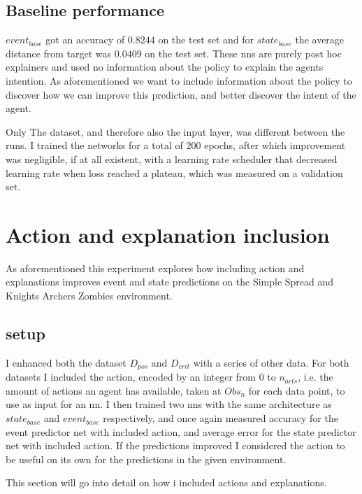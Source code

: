 \documentclass[UKenglish]{uiomasterthesis}
\begin{document}
\subsection{Baseline performance}
$event_{base}$ got an accuracy of $0.8244$ on the test set and for $state_{base}$ the average distance from target was $0.0409$ on the test set. These \acp{nn} are purely post hoc explainers and used no information about the policy to explain the agents intention. As aforementioned we want to include information about the policy to discover how we can improve this prediction, and better discover the intent of the agent.

 Only The dataset, and therefore also the input layer, was different between the runs. I trained the networks for a total of $200$ epochs, after which improvement was negligible, if at all existent, with a learning rate scheduler that decreased learning rate when loss reached a plateau, which was measured on a validation set.

\section{Action and explanation inclusion}
\label{sec:exp_1}
As aforementioned this experiment explores how including action and explanations improves event and state predictions on the Simple Spread and Knights Archers Zombies environment.

\subsection{setup}
I enhanced both the dataset $D_{pos}$ and $D_{crit}$ with a series of other data. For both datasets I included the action, encoded by an integer from $0$ to $n_{acts}$, i.e. the amount of actions an agent has available, taken at $Obs_n$ for each data point, to use as input for an \ac{nn}. I then trained two \acp{nn} with the same architecture as $state_{base}$ and $event_{base}$ respectively, and once again measured accuracy for the event predictor net with included action, and average error for the state predictor net with included action. If the predictions improved I considered the action to be useful on its own for the predictions in the given environment.

This section will go into detail on how i included actions and explanations.
\end{document}
